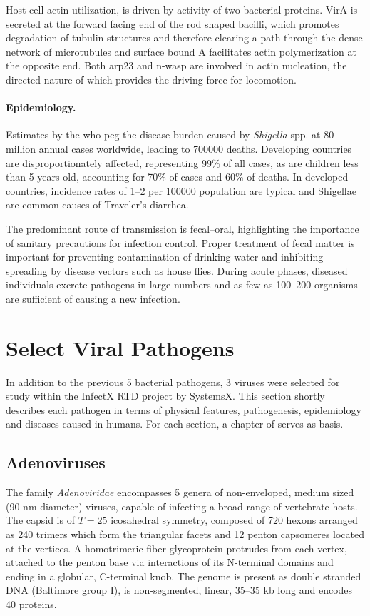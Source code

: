 Host-cell actin utilization, is driven by activity of two bacterial proteins. VirA is secreted at the forward facing end of the rod shaped bacilli, which promotes degradation of tubulin structures and therefore clearing a path through the dense network of microtubules and surface bound A facilitates actin polymerization at the opposite end. Both \gls{arp23} and \gls{n-wasp} are involved in actin nucleation, the directed nature of which provides the driving force for locomotion.

\paragraph{Epidemiology.}
Estimates by the \gls{who} peg the disease burden caused by \textit{Shigella} spp. at 80 million annual cases worldwide, leading to 700000 deaths. Developing countries are disproportionately affected, representing 99\% of all cases, as are children less than 5 years old, accounting for 70\% of cases and 60\% of deaths. In developed countries, incidence rates of 1--2 per 100000 population are typical and Shigellae are common causes of Traveler's diarrhea.

The predominant route of transmission is fecal--oral, highlighting the importance of sanitary precautions for infection control. Proper treatment of fecal matter is important for preventing contamination of drinking water and inhibiting spreading by disease vectors such as house flies. During acute phases, diseased individuals excrete pathogens in large numbers and as few as 100--200 organisms are sufficient of causing a new infection.

\section{Select Viral Pathogens}

In addition to the previous 5 bacterial pathogens, 3 viruses were selected for study within the InfectX RTD project by SystemsX. This section shortly describes each pathogen in terms of physical features, pathogenesis, epidemiology and diseases caused in humans. For each section, a chapter of \cite{Craighead2000} serves as basis.

\subsection{Adenoviruses}
The family \textit{Adenoviridae} encompasses 5 genera of non-enveloped, medium sized (90 nm diameter) viruses, capable of infecting a broad range of vertebrate hosts. The capsid is of $T=25$ icosahedral symmetry, composed of 720 hexons arranged as 240 trimers which form the triangular facets and 12 penton capsomeres located at the vertices. A homotrimeric fiber glycoprotein protrudes from each vertex, attached to the penton base via interactions of its N-terminal domains and ending in a globular, C-terminal knob. The genome is present as double stranded DNA (Baltimore group I), is non-segmented, linear, 35--35 kb long and encodes 40 proteins.

